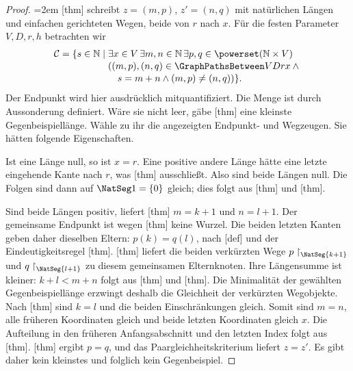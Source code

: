 \begin{proof}
\emergencystretch=2em
[thm] schreibt
\(z=(m,p)\), \(z'=(n,q)\) mit natürlichen Längen und einfachen
gerichteten Wegen, beide von \(r\) nach \(x\).
Für die festen Parameter \(V,D,r,h\) betrachten wir
\[
\begin{aligned}
 \mathcal C=\{s\in\mathbb N\mid{}&\exists x\in V\,\exists m,n\in\mathbb N\,
   \exists p,q\in\powerset(\mathbb N\times V)\\[-2pt]
 &((m,p),(n,q)\in\GraphPathsBetween VDrx\land{}\\[-2pt]
 &\quad s=m+n\land(m,p)\ne(n,q))\}.
\end{aligned}
\]
Der Endpunkt wird hier ausdrücklich mitquantifiziert. Die Menge ist
durch Aussonderung definiert. Wäre sie nicht leer, gäbe
[thm] eine kleinste
Gegenbeispiellänge. Wähle zu ihr die angezeigten Endpunkt- und
Wegzeugen. Sie hätten folgende Eigenschaften.

Ist eine Länge null, so ist \(x=r\). Eine positive andere Länge
hätte eine letzte eingehende Kante nach \(r\), was
[thm] ausschließt.
Also sind beide Längen null. Die Folgen sind dann auf
\(\NatSeg1=\{0\}\) gleich; dies folgt aus
[thm] und
[thm].

Sind beide Längen positiv, liefert
[thm]
\(m=k+1\) und \(n=l+1\). Der gemeinsame Endpunkt ist wegen
[thm] keine Wurzel.
Die beiden letzten Kanten geben daher dieselben Eltern:
\(p(k)=q(l)\), nach [def]
und der Eindeutigkeitsregel
[thm].
[thm] liefert die beiden
verkürzten Wege \(p\restriction_{\NatSeg{k+1}}\) und
\(q\restriction_{\NatSeg{l+1}}\) zu diesem gemeinsamen Elternknoten.
Ihre Längensumme ist kleiner: \(k+l<m+n\) folgt aus
[thm] und
[thm]. Die Minimalität
der gewählten Gegenbeispiellänge erzwingt deshalb die Gleichheit
der verkürzten Wegobjekte. Nach
[thm]
sind \(k=l\) und die beiden Einschränkungen gleich.
Somit sind \(m=n\), alle früheren Koordinaten gleich und beide
letzten Koordinaten gleich \(x\). Die Aufteilung in den früheren
Anfangsabschnitt und den letzten Index folgt aus
[thm].
[thm] ergibt \(p=q\),
und das Paargleichheitskriterium liefert \(z=z'\).
Es gibt daher kein kleinstes und folglich kein Gegenbeispiel.
\end{proof}

